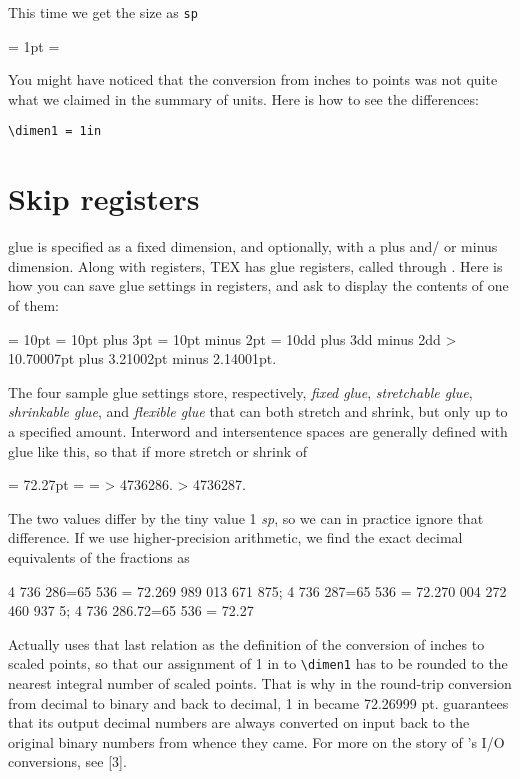 {\noindent This time we get the size as \texttt{sp} }


 = 1pt
 = 
\the{}




You might have noticed that the conversion from inches to points was not
quite what we claimed in the summary of \tex units. Here is how to see the
differences:

\verb+\dimen1 = 1in+


\section{Skip registers}
\tex glue is specified as a fixed dimension, and optionally, with a plus and/
or minus dimension. Along with  registers, TEX has glue registers,
called  through . Here is how you can save glue settings in
 registers, and ask \tex to display the contents of one of them:

\begin{teX}
 = 10pt
 = 10pt plus 3pt
 = 10pt minus 2pt
 = 10dd plus 3dd minus 2dd
\showthe {}
> 10.70007pt plus 3.21002pt minus 2.14001pt.
\end{teX}


The four sample glue settings store, respectively, \textit{fixed glue}, \textit{stretchable
glue}, \textit{shrinkable glue}, and \textit{flexible glue} that can both stretch and shrink,
but only up to a specified amount. Interword and intersentence spaces are
generally defined with glue like this, so that if more stretch or shrink of

\begin{teX}
 = 72.27pt
 = 
 = 
\showthe {}
> 4736286.
\showthe {}
> 4736287.
\end{teX}

The two values differ by the tiny value 1 \textit{sp}, so we can in practice ignore
that difference. If we use higher-precision arithmetic, we find the exact
decimal equivalents of the fractions as

\begin{teX}
4 736 286=65 536 = 72.269 989 013 671 875;
4 736 287=65 536 = 72.270 004 272 460 937 5;
4 736 286.72=65 536 = 72.27
\end{teX}


Actually \tex uses that last relation as the definition of the conversion of
inches to scaled points, so that our assignment of 1 in to \verb+\dimen1+ has to
be rounded to the nearest integral number of scaled points. That is why
in the round-trip conversion from decimal to binary and back to decimal,
1 in became 72.26999 pt. \tex guarantees that its output decimal numbers
are always converted on input back to the original binary numbers from
whence they came. For more on the story of \tex’s I/O conversions, see [3].


